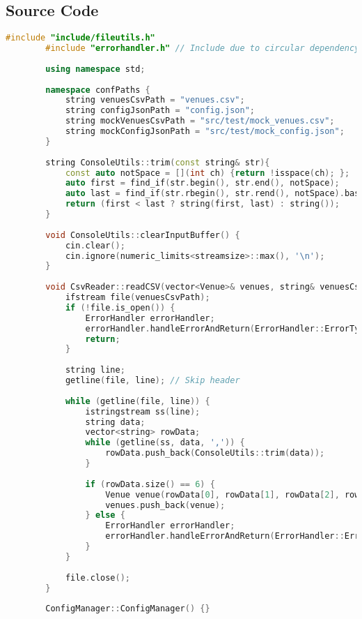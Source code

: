 \documentclass{article}
\begin{document}
	\subsection*{Source Code}
	\begin{mdframed}[backgroundcolor=background, hidealllines=false, innerleftmargin=15pt, innerrightmargin=5pt, innertopmargin=0pt, innerbottommargin=-5pt]
	\begin{lstlisting}[language=C++]
		#include "include/fileutils.h"
		#include "errorhandler.h" // Include due to circular dependency between fileutils.h and errorhandler.h
		
		using namespace std;
		
		namespace confPaths {
			string venuesCsvPath = "venues.csv";
			string configJsonPath = "config.json";
			string mockVenuesCsvPath = "src/test/mock_venues.csv";
			string mockConfigJsonPath = "src/test/mock_config.json";
		}
		
		string ConsoleUtils::trim(const string& str){
			const auto notSpace = [](int ch) {return !isspace(ch); };
			auto first = find_if(str.begin(), str.end(), notSpace);
			auto last = find_if(str.rbegin(), str.rend(), notSpace).base();
			return (first < last ? string(first, last) : string());
		}
		
		void ConsoleUtils::clearInputBuffer() {
			cin.clear();
			cin.ignore(numeric_limits<streamsize>::max(), '\n');
		}
		
		void CsvReader::readCSV(vector<Venue>& venues, string& venuesCsvPath) {
			ifstream file(venuesCsvPath);
			if (!file.is_open()) {
				ErrorHandler errorHandler;
				errorHandler.handleErrorAndReturn(ErrorHandler::ErrorType::CONFIG_OPEN_ERROR, venuesCsvPath);
				return;
			}
			
			string line;
			getline(file, line); // Skip header
			
			while (getline(file, line)) {
				istringstream ss(line);
				string data;
				vector<string> rowData;
				while (getline(ss, data, ',')) {
					rowData.push_back(ConsoleUtils::trim(data));
				}
				
				if (rowData.size() == 6) {
					Venue venue(rowData[0], rowData[1], rowData[2], rowData[3], rowData[4], stoi(rowData[5]));
					venues.push_back(venue);
				} else {
					ErrorHandler errorHandler;
					errorHandler.handleErrorAndReturn(ErrorHandler::ErrorType::INVALID_DATA_IN_CSV, venuesCsvPath);
				}
			}
			
			file.close();
		}
		
		ConfigManager::ConfigManager() {}
		

\end{lstlisting}
\end{mdframed}
\end{document}
